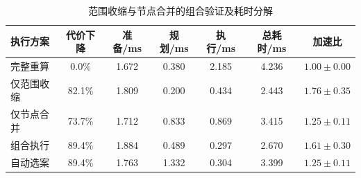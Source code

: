 \begin{table}[htbp]
    \centering
    \scriptsize
    \setlength{\tabcolsep}{4pt}
    \renewcommand\arraystretch{1.2}
    \caption{范围收缩与节点合并的组合验证及耗时分解}
    \label{tab:prototype_composition}
    \begin{tabular}{p{2.0cm}cccccc}
        \toprule
        执行方案 & 代价下降 & 准备/ms & 规划/ms & 执行/ms & 总耗时/ms & 加速比 \\
        \midrule
        完整重算 & 0.0\% & 1.672 & 0.380 & 2.185 & 4.236 & $1.00\pm0.00$ \\
        仅范围收缩 & 82.1\% & 1.809 & 0.200 & 0.434 & 2.443 & $1.76\pm0.35$ \\
        仅节点合并 & 73.7\% & 1.712 & 0.833 & 0.869 & 3.415 & $1.25\pm0.11$ \\
        组合执行 & 89.4\% & 1.884 & 0.489 & 0.297 & 2.670 & $1.61\pm0.30$ \\
        自动选案 & 89.4\% & 1.763 & 1.332 & 0.304 & 3.399 & $1.25\pm0.11$ \\
        \bottomrule
    \end{tabular}
\end{table}
